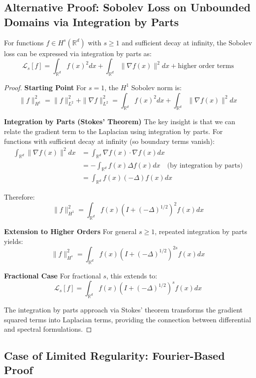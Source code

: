 \documentclass[a4paper]{article}
\begin{document}
\subsection{Alternative Proof: Sobolev Loss on Unbounded Domains via Integration by Parts}

\begin{theorem}
For functions $f \in H^s(\mathbb{R}^d)$ with $s \geq 1$ and sufficient decay at infinity, the Sobolev loss can be expressed via integration by parts as:
\[ \mathcal{L}_s[f] = \int_{\mathbb{R}^d} f(x)^2 dx + \int_{\mathbb{R}^d} \|\nabla f(x)\|^2 dx + \text{higher order terms} \]
\end{theorem}

\begin{proof}
\textbf{Starting Point}
For $s = 1$, the $H^1$ Sobolev norm is:
\[ \|f\|_{H^1}^2 = \|f\|_{L^2}^2 + \|\nabla f\|_{L^2}^2 = \int_{\mathbb{R}^d} f(x)^2 dx + \int_{\mathbb{R}^d} \|\nabla f(x)\|^2 dx \]

\textbf{Integration by Parts (Stokes' Theorem)}
The key insight is that we can relate the gradient term to the Laplacian using integration by parts. For functions with sufficient decay at infinity (so boundary terms vanish):
\begin{align}
\int_{\mathbb{R}^d} \|\nabla f(x)\|^2 dx &= \int_{\mathbb{R}^d} \nabla f(x) \cdot \nabla f(x) dx \\
&= -\int_{\mathbb{R}^d} f(x) \Delta f(x) dx \quad \text{(by integration by parts)} \\
&= \int_{\mathbb{R}^d} f(x) (-\Delta) f(x) dx
\end{align}

Therefore:
\[ \|f\|_{H^1}^2 = \int_{\mathbb{R}^d} f(x) (I + (-\Delta)^{1/2})^2 f(x) dx \]

\textbf{Extension to Higher Orders}
For general $s \geq 1$, repeated integration by parts yields:
\[ \|f\|_{H^s}^2 = \int_{\mathbb{R}^d} f(x) (I + (-\Delta)^{1/2})^{2s} f(x) dx \]

\textbf{Fractional Case}
For fractional $s$, this extends to:
\[ \mathcal{L}_s[f] = \int_{\mathbb{R}^d} f(x) (I + (-\Delta)^{1/2})^s f(x) dx \]

The integration by parts approach via Stokes' theorem transforms the gradient squared terms into Laplacian terms, providing the connection between differential and spectral formulations.
\end{proof}

\subsection{Case of Limited Regularity: Fourier-Based Proof}
\end{document}
